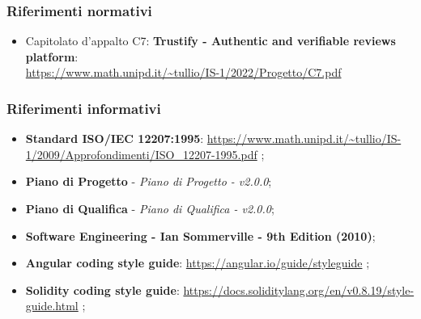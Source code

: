 \subsubsection{Riferimenti normativi}
\begin{itemize}
    \item Capitolato d'appalto C7: \textbf{Trustify - Authentic and verifiable reviews platform}: \\
          \url{https://www.math.unipd.it/~tullio/IS-1/2022/Progetto/C7.pdf}
          \hfill{}
\end{itemize}
\subsubsection{Riferimenti informativi}
\begin{itemize}
    \item \textbf{Standard ISO/IEC 12207:1995}: \url{https://www.math.unipd.it/~tullio/IS-1/2009/Approfondimenti/ISO_12207-1995.pdf} \hfill{};
    \item \textbf{Piano di Progetto} - \textit{Piano di Progetto - v2.0.0};
    \item \textbf{Piano di Qualifica} - \textit{Piano di Qualifica - v2.0.0};
    \item \textbf{Software Engineering - Ian Sommerville - 9th Edition (2010)};
    \item \textbf{Angular coding style guide}: \url{https://angular.io/guide/styleguide} \hfill{};
    \item \textbf{Solidity coding style guide}: \url{https://docs.soliditylang.org/en/v0.8.19/style-guide.html} \hfill{};
\end{itemize}
